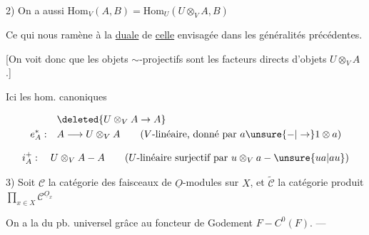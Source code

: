 2) On a aussi $\mathrm{Hom}_V(A,B)=\mathrm{Hom}_U(U\otimes_V A,B)$

Ce qui nous ramène à la  \uline{duale} de \uline{celle}  envisagée dans les généralités précédentes. 

[On voit donc que les objets  $\sim$-projectifs sont les facteurs directs d'objets $U\otimes_V A$.]

Ici les hom. canoniques 

\[
\begin{aligned}
&\deleted{U\otimes_V A\to A}\\
e_A^*:\quad & A\longrightarrow U\otimes_V A \qquad (V\text{-linéaire, donné par }a\unsure{-|\to}1\otimes a)
\end{aligned}
\]

\[
i_A^{+}:\quad U\otimes_V A-A \qquad (U\text{-linéaire surjectif par }u\otimes_V a-\unsure{ua|au})
\]

3) Soit $\mathcal C$ la catégorie des faisceaux de $\underline O$-modules sur $X$, et $\widetilde{\mathcal C}$ la catégorie produit $\prod_{x\in X}\mathcal C^{\underline O_x}$

On a la  du pb. universel grâce au foncteur de Godement $F-C^0(F)$. \quad ---

